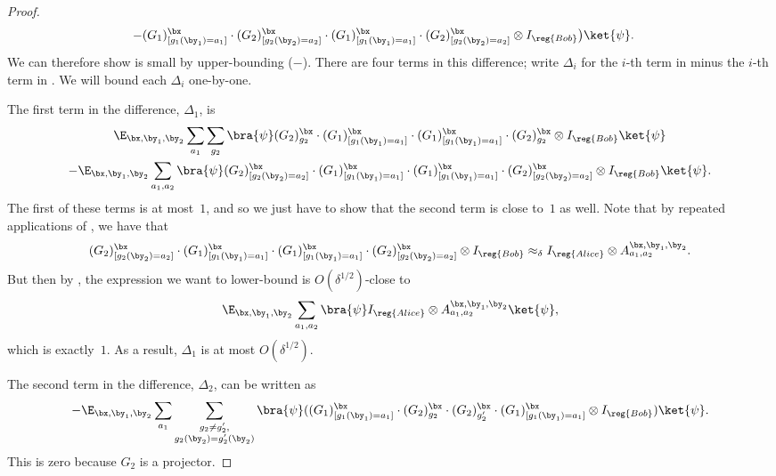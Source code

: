 \begin{proof}
\begin{align}
	- &(G_1)^{\bx}_{[g_1(\by_1) = a_1]} \cdot (G_2)^\bx_{[g_2(\by_2) = a_2]} \cdot (G_1)^{\bx}_{[g_1(\by_1) = a_1]} \cdot (G_2)^\bx_{[g_2(\by_2) = a_2]}\otimes I_{\reg{Bob}} \big)\ket{\psi}.\label{eq:what-to-do-with-this}
\end{align}
We can therefore show  is small by
upper-bounding ($ - $).
There are four terms in this difference;
write $\Delta_i$ for the $i$-th term in  minus the $i$-th term in .
We will bound each $\Delta_i$ one-by-one.

The first term in the difference, $\Delta_1$, is
\begin{multline*}
\E_{\bx, \by_1, \by_2} \sum_{a_1}\sum_{g_2} \bra{\psi}
	(G_2)^{\bx}_{g_2}
	\cdot (G_1)^{\bx}_{[g_1(\by_1) = a_1]} \cdot (G_1)^{\bx}_{[g_1(\by_1) = a_1]} \cdot (G_2)^{\bx}_{g_2} \otimes I_{\reg{Bob}} \ket{\psi}\\
-\E_{\bx, \by_1, \by_2} \sum_{a_1, a_2} \bra{\psi}
	(G_2)^{\bx}_{[g_2(\by_2) = a_2]}
	\cdot (G_1)^{\bx}_{[g_1(\by_1) = a_1]} \cdot (G_1)^{\bx}_{[g_1(\by_1) = a_1]} \cdot (G_2)^{\bx}_{[g_2(\by_2) = a_2]} \otimes I_{\reg{Bob}} \ket{\psi}.
\end{multline*}
The first of these terms is at most~$1$, and so we just have to show that the second term is close to~$1$ as well.
Note that by repeated applications of , we have that 
\begin{equation*}
(G_2)^{\bx}_{[g_2(\by_2) = a_2]}
	\cdot (G_1)^{\bx}_{[g_1(\by_1) = a_1]} \cdot (G_1)^{\bx}_{[g_1(\by_1) = a_1]} \cdot (G_2)^{\bx}_{[g_2(\by_2) = a_2]} \otimes I_{\reg{Bob}}
	\approx_{\delta} I_{\reg{Alice}} \otimes A^{\bx, \by_1, \by_2}_{a_1, a_2}.
\end{equation*}
But then by , the expression we want to lower-bound is $O(\delta^{1/2})$-close to
\begin{equation*}
\E_{\bx, \by_1, \by_2} \sum_{a_1, a_2} \bra{\psi} I_{\reg{Alice}} \otimes A^{\bx, \by_1, \by_2}_{a_1, a_2} \ket{\psi},
\end{equation*}
which is exactly~$1$. As a result, $\Delta_1$ is at most $O(\delta^{1/2})$.

The second term in the difference, $\Delta_2$, can be written as
\begin{equation*}
-\E_{\bx, \by_1, \by_2} \sum_{a_1}\sum_{\substack{g_2\neq g_2',\\g_2(\by_2) = g_2'(\by_2)}} \bra{\psi}(
	(G_1)^{\bx}_{[g_1(\by_1) = a_1]} \cdot (G_2)^{\bx}_{g_2} \cdot (G_2)^{\bx}_{g_2'} \cdot (G_1)^{\bx}_{[g_1(\by_1) = a_1]} \otimes I_{\reg{Bob}})\ket{\psi}.
\end{equation*}
This is zero because $G_2$ is a projector.


\end{proof}

